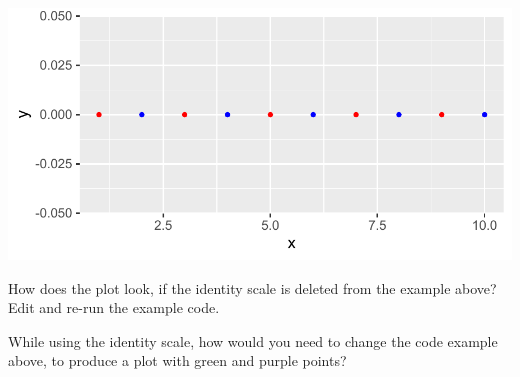 \documentclass[krantz2]{krantz}\usepackage{knitr}
\begin{document}
\begin{knitrout}\footnotesize
{}\color{fgcolor}\begin{kframe}
\begin{alltt}
 \hlkwb{<-} \hlstd{(} \hlstd{=} \hlopt{:}\hlstd{,}  \hlstd{=} \hlstd{(}\hlstd{),}  \hlstd{=} \hlstd{(}\hlstd{(}\hlstd{,} \hlstd{),} \hlstd{))}

    \hlopt{+}
  \hlstd{()} \hlopt{+}
  \hlstd{()}
\end{alltt}
\end{kframe}

{\centering \includegraphics[width=.7\textwidth]{figure/pos-scale-color-10-1} 

}



\end{knitrout}

\begin{playground}
How does the plot look, if the identity scale is deleted from the example above? Edit and re-run the example code.

While using the identity scale, how would you need to change the code example above, to produce a plot with green and purple points?
\end{playground}
\end{document}
